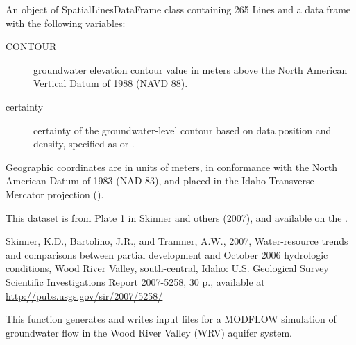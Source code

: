 \documentclass[a4paper]{book}
\begin{document}
%
\begin{Format}
An object of SpatialLinesDataFrame class containing 265 Lines and a
data.frame with the following variables:
\begin{description}

\item[CONTOUR] groundwater elevation contour value in meters above the
North American Vertical Datum of 1988 (NAVD 88).
\item[certainty] certainty of the groundwater-level contour based on
data position and density, specified as  or .

\end{description}

Geographic coordinates are in units of meters, in conformance with the
North American Datum of 1983 (NAD 83), and placed in the
Idaho Transverse Mercator projection ().
\end{Format}
%
\begin{Source}\relax
This dataset is from Plate 1 in Skinner and others (2007), and available on the
.
\end{Source}
%
\begin{References}\relax
Skinner, K.D., Bartolino, J.R., and Tranmer, A.W., 2007,
Water-resource trends and comparisons between partial development and
October 2006 hydrologic conditions, Wood River Valley, south-central, Idaho:
U.S. Geological Survey Scientific Investigations Report 2007-5258, 30 p.,
available at \url{http://pubs.usgs.gov/sir/2007/5258/}
\end{References}
%
\begin{Examples}
\end{Examples}
%
\begin{Description}\relax
This function generates and writes input files for a MODFLOW simulation of
groundwater flow in the Wood River Valley (WRV) aquifer system.
\end{Description}
\end{document}
